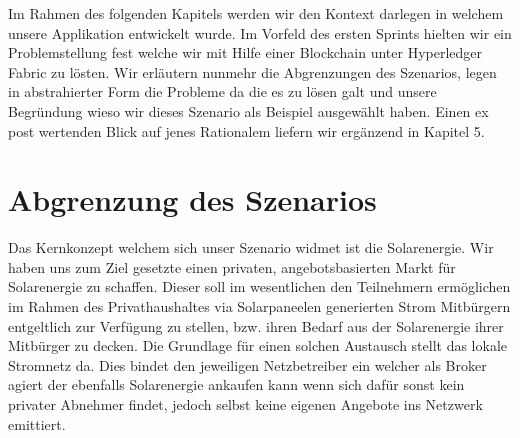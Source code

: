 Im Rahmen des folgenden Kapitels werden wir den Kontext darlegen in welchem unsere Applikation entwickelt wurde. Im Vorfeld des ersten Sprints hielten wir ein Problemstellung fest welche wir mit Hilfe einer Blockchain unter Hyperledger Fabric zu lösten. Wir erläutern nunmehr die Abgrenzungen des Szenarios, legen in abstrahierter Form die Probleme da die es zu lösen galt und unsere  Begründung wieso wir dieses Szenario als Beispiel ausgewählt haben.  Einen ex post wertenden Blick auf jenes Rationalem liefern wir ergänzend in Kapitel 5.

\section{Abgrenzung des Szenarios}
Das Kernkonzept welchem sich unser Szenario widmet ist die Solarenergie. Wir haben uns zum Ziel gesetzte einen privaten, angebotsbasierten Markt für Solarenergie zu schaffen. Dieser soll im wesentlichen den Teilnehmern ermöglichen im Rahmen des Privathaushaltes via Solarpaneelen generierten Strom Mitbürgern entgeltlich zur Verfügung zu stellen, bzw. ihren Bedarf aus der Solarenergie ihrer Mitbürger zu decken. Die Grundlage für einen solchen Austausch stellt das lokale Stromnetz da. Dies bindet den jeweiligen Netzbetreiber ein welcher als Broker agiert der ebenfalls Solarenergie ankaufen kann wenn sich dafür sonst kein privater Abnehmer findet, jedoch selbst keine eigenen Angebote ins Netzwerk emittiert.

